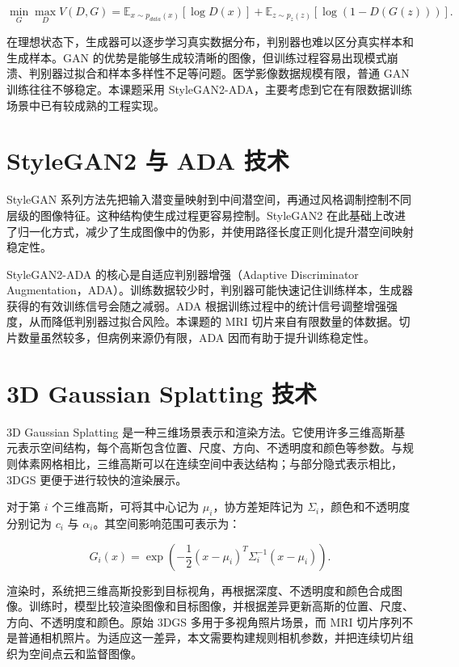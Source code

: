 \begin{equation}
\min_G \max_D V(D,G)=\mathbb{E}_{x\sim p_{data}(x)}[\log D(x)] + \mathbb{E}_{z\sim p_z(z)}[\log(1-D(G(z)))] .
\end{equation}

在理想状态下，生成器可以逐步学习真实数据分布，判别器也难以区分真实样本和生成样本。GAN 的优势是能够生成较清晰的图像，但训练过程容易出现模式崩溃、判别器过拟合和样本多样性不足等问题。医学影像数据规模有限，普通 GAN 训练往往不够稳定。本课题采用 StyleGAN2-ADA，主要考虑到它在有限数据训练场景中已有较成熟的工程实现。

\section{StyleGAN2 与 ADA 技术}
StyleGAN 系列方法先把输入潜变量映射到中间潜空间，再通过风格调制控制不同层级的图像特征\cite{karras2019stylegan}。这种结构使生成过程更容易控制。StyleGAN2 在此基础上改进了归一化方式，减少了生成图像中的伪影，并使用路径长度正则化提升潜空间映射稳定性\cite{karras2020stylegan2}。

StyleGAN2-ADA 的核心是自适应判别器增强（Adaptive Discriminator Augmentation，ADA）。训练数据较少时，判别器可能快速记住训练样本，生成器获得的有效训练信号会随之减弱。ADA 根据训练过程中的统计信号调整增强强度，从而降低判别器过拟合风险\cite{karras2020ada}。本课题的 MRI 切片来自有限数量的体数据。切片数量虽然较多，但病例来源仍有限，ADA 因而有助于提升训练稳定性。

\section{3D Gaussian Splatting 技术}
3D Gaussian Splatting 是一种三维场景表示和渲染方法。它使用许多三维高斯基元表示空间结构，每个高斯包含位置、尺度、方向、不透明度和颜色等参数。与规则体素网格相比，三维高斯可以在连续空间中表达结构；与部分隐式表示相比，3DGS 更便于进行较快的渲染展示\cite{kerbl20233dgs}。

对于第 $i$ 个三维高斯，可将其中心记为 $\mu_i$，协方差矩阵记为 $\Sigma_i$，颜色和不透明度分别记为 $c_i$ 与 $\alpha_i$。其空间影响范围可表示为：

\begin{equation}
G_i(x)=\exp\left(-\frac{1}{2}(x-\mu_i)^{T}\Sigma_i^{-1}(x-\mu_i)\right).
\end{equation}

渲染时，系统把三维高斯投影到目标视角，再根据深度、不透明度和颜色合成图像。训练时，模型比较渲染图像和目标图像，并根据差异更新高斯的位置、尺度、方向、不透明度和颜色。原始 3DGS 多用于多视角照片场景，而 MRI 切片序列不是普通相机照片。为适应这一差异，本文需要构建规则相机参数，并把连续切片组织为空间点云和监督图像。

